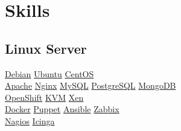 \documentclass[]{joaosoares-resume}
\begin{document}
\begin{minipage}[t]{0.35\textwidth}



\section{Skills}
\subsection{Linux Server}
\href{http://www.debian.org/}{Debian}\textbullet{}
\href{http://www.ubuntu.com/}{Ubuntu}\textbullet{}
\href{http://www.centos.org/}{CentOS} \\
\href{http://httpd.apache.org/}{Apache}\textbullet{}
\href{https://www.nginx.com/resources/wiki/}{Nginx}\textbullet{}
\href{https://www.mysql.com/}{MySQL} \textbullet{}
\href{http://www.postgresql.org/}{PostgreSQL} \textbullet{}
\href{https://www.mongodb.com/}{MongoDB} \\
\href{https://www.openshift.com/}{OpenShift} \textbullet{}
\href{http://www.linux-kvm.org/}{KVM} \textbullet{}
\href{http://xenproject.org/}{Xen} \\
\href{http://www.docker.com/}{Docker} \textbullet{}
\href{http://puppetlabs.com/}{Puppet} \textbullet{}
\href{https://www.ansible.com/}{Ansible} \textbullet{}
\href{http://www.zabbix.com/}{Zabbix} \\
\href{http://www.nagios.com/}{Nagios} \textbullet{}
\href{https://www.icinga.org/}{Icinga} \\
\sectionsep


\end{minipage}
\end{document}
